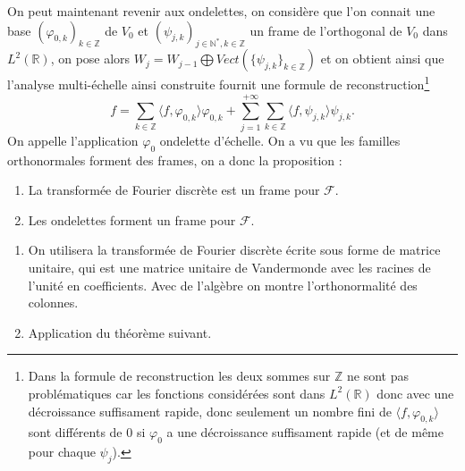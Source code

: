 On peut maintenant revenir aux ondelettes, on considère que l'on connait une base $(\varphi_{0,k})_{k\in \mathbb{Z}}$ de $V_0$ et $(\psi_{j,k})_{j\in \mathbb{N}^*, k \in \mathbb{Z}}$ un frame de l'orthogonal de $V_0$ dans $L^2(\mathbb{R})$, on pose alors $W_j = W_{j-1} \bigoplus Vect(\{\psi_{j,k}\}_{k\in \mathbb{Z}})$ et on obtient ainsi que l'analyse multi-échelle ainsi construite fournit une formule de reconstruction\footnote{Dans la formule de reconstruction les deux sommes sur $\mathbb{Z}$ ne sont pas problématiques car les fonctions considérées sont dans $L^2(\mathbb{R})$ donc avec une décroissance suffisament rapide, donc seulement un nombre fini de $\langle f, \varphi_{0,k} \rangle$ sont différents de 0 si $\varphi_0$ a une décroissance suffisament rapide (et de même pour chaque $\psi_j$).}
\begin{equation}
	f = \sum_{k\in \mathbb{Z}} \langle f, \varphi_{0,k} \rangle \varphi_{0,k} + \sum_{j = 1}^{+\infty} \sum_{k\in \mathbb{Z}} \langle f, \psi_{j,k} \rangle \psi_{j,k}.
\end{equation}
On appelle l'application $\varphi_0$ ondelette d'échelle.
On a vu que les familles orthonormales forment des frames, on a donc la proposition :
\begin{proposition}
	\begin{enumerate}
		\item La transformée de Fourier discrète est un frame pour $\mathcal{F}$.
		\item Les ondelettes forment un frame pour $\mathcal{F}$.
	\end{enumerate}
\end{proposition}
\begin{preuve}
	\begin{enumerate}
		\item On utilisera la transformée de Fourier discrète écrite sous forme de matrice unitaire, qui est une matrice unitaire de Vandermonde avec les racines de l'unité en coefficients. Avec de l'algèbre on montre l'orthonormalité des colonnes.
		\item Application du théorème suivant.
	\end{enumerate}
\end{preuve}

